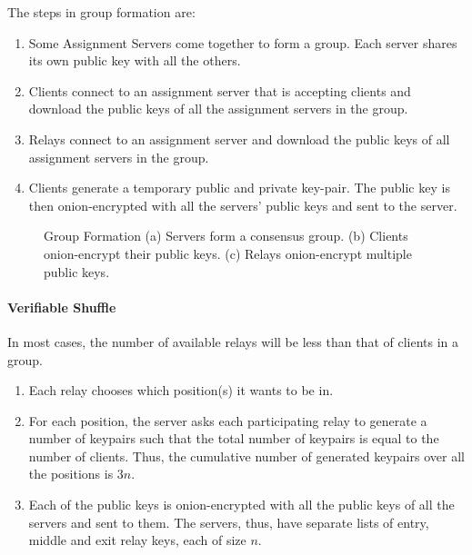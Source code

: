 The steps in group formation are: 
\begin{enumerate} 
\item Some Assignment Servers come together to form a group. Each server shares 
its own public key with all the others. 
\item Clients connect to an assignment server that is accepting clients and 
download the public keys of all the assignment servers in the group.
\item Relays connect to an assignment server and download the public
keys of all assignment servers in the group. 
\item Clients generate a temporary public and private key-pair. The public key 
is then onion-encrypted with all the servers' public keys and sent to the server.
\end{enumerate}

\begin{figure}[htbp]
  \centering
  \caption{Group Formation (a) Servers form a consensus group. 
    (b) Clients onion-encrypt their public keys. 
    (c) Relays onion-encrypt multiple public keys.}
  \label{rfidtag_testing}
\end{figure}

\paragraph{Verifiable Shuffle}

In most cases, the number of available relays will be less than that of clients 
in a group. 
\begin{enumerate} 
\item Each relay chooses which position(s) it wants to be in.
\item For each position, the server asks each participating relay to generate a 
number of keypairs
such that the total number of keypairs is equal to the number of clients. Thus,
the cumulative number of generated keypairs over all the positions is $3n$.
\item Each of the public keys is onion-encrypted with all the public keys of all the 
servers and sent to them. The servers, thus, have separate lists of entry, middle
and exit relay keys, each of size $n$.
\end{enumerate}

